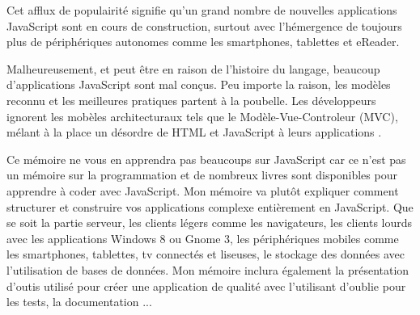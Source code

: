 Cet afflux de populairité signifie qu’un grand nombre de nouvelles applications JavaScript sont en cours de construction, surtout avec l’hémergence de toujours plus de périphériques autonomes comme les smartphones, tablettes et eReader.

Malheureusement, et peut être en raison de l’histoire du langage, beaucoup d’applications JavaScript sont mal conçus. Peu importe la raison, les modèles reconnu et les meilleures pratiques partent à la poubelle. Les développeurs ignorent les mobèles architecturaux tels que le Modèle-Vue-Controleur (MVC), mélant à la place un désordre de HTML et JavaScript à leurs applications .

Ce mémoire ne vous en apprendra pas beaucoups sur JavaScript car ce n’est pas un mémoire sur la programmation et de nombreux livres sont disponibles pour apprendre à coder avec JavaScript. Mon mémoire va plutôt expliquer comment structurer et construire vos applications complexe entièrement en JavaScript. Que se soit  la partie serveur, les clients légers comme les navigateurs, les clients lourds avec les applications Windows 8 ou Gnome 3, les périphériques mobiles comme les smartphones, tablettes, tv connectés et liseuses, le stockage des données avec l’utilisation de bases de données. Mon mémoire inclura également la présentation d’outis utilisé pour créer une application de qualité avec l’utilisant d’oublie pour les tests, la documentation ...

